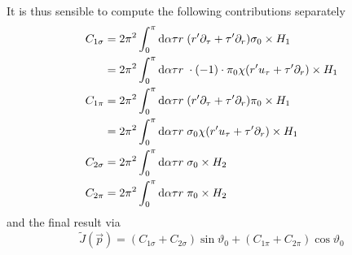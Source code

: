 It is thus sensible to compute the following contributions separately
\begin{subequations}
    \begin{align}
        C_{1\sigma} & =2\pi^2\int_0^\pi\text{d}\alpha\tau r\;(r^\prime\partial_\tau+\tau^\prime\partial_r)\sigma_0\times H_1            \\
                    & =2\pi^2\int_0^\pi\text{d}\alpha\tau r\;\cdot (-1)\cdot\pi_0\chi (r^\prime u_\tau+\tau^\prime\partial_r)\times H_1 \\
        C_{1\pi}    & =2\pi^2\int_0^\pi\text{d}\alpha\tau r\;(r^\prime\partial_\tau+\tau^\prime\partial_r)\pi_0\times H_1               \\
                    & =2\pi^2\int_0^\pi\text{d}\alpha\tau r\;\sigma_0\chi (r^\prime u_\tau+\tau^\prime\partial_r)\times H_1             \\
        C_{2\sigma} & =2\pi^2\int_0^\pi\text{d}\alpha\tau r\;\sigma_0\times H_2                                                         \\
        C_{2\pi}    & =2\pi^2\int_0^\pi\text{d}\alpha\tau r\;\pi_0\times H_2
    \end{align}
\end{subequations}
and the final result via
\begin{equation}
    \tilde{J}(\vec{p})=(C_{1\sigma}+C_{2\sigma})\sin\vartheta_0+(C_{1\pi}+C_{2\pi})\cos\vartheta_0
\end{equation}